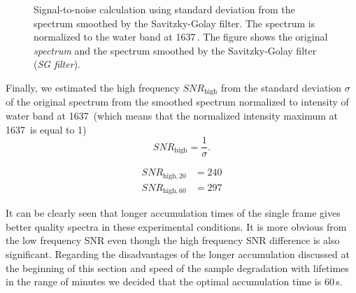 \begin{figure}
	\centering
	
	\caption{Signal-to-noise calculation using standard deviation from the
	  spectrum smoothed by the Savitzky-Golay filter. The spectrum is normalized
		to the water band at 1637\,\icm{}. The figure shows the original
		\emph{spectrum} and the spectrum smoothed by the Savitzky-Golay filter
		(\emph{SG filter}).}
	\label{\figlabel{accum_length:sn_ratio_sg}}
\end{figure}

Finally, we estimated the high frequency $SNR_\text{high}$ from the standard
deviation $\sigma$ of the original spectrum from the smoothed spectrum
normalized to intensity of water band at 1637\,\icm{} (which means that the
normalized intensity maximum at 1637\,\icm{} is equal to 1)
\begin{equation*}
	SNR_\text{high} = \frac{1}{\sigma}.
\end{equation*}

\begin{align*}
	SNR_{\text{high},20} &= 240 \\
	SNR_{\text{high},60} &= 297
\end{align*}

It can be clearly seen that longer accumulation times of the single frame gives
better quality spectra in these experimental conditions. It is more obvious
from the low frequency SNR even though the high frequency SNR difference is
also significant. Regarding the disadvantages of the
longer accumulation discussed at the beginning of this section and speed of
the sample degradation with lifetimes in the range of minutes we decided that
the optimal accumulation time is 60\,s.
